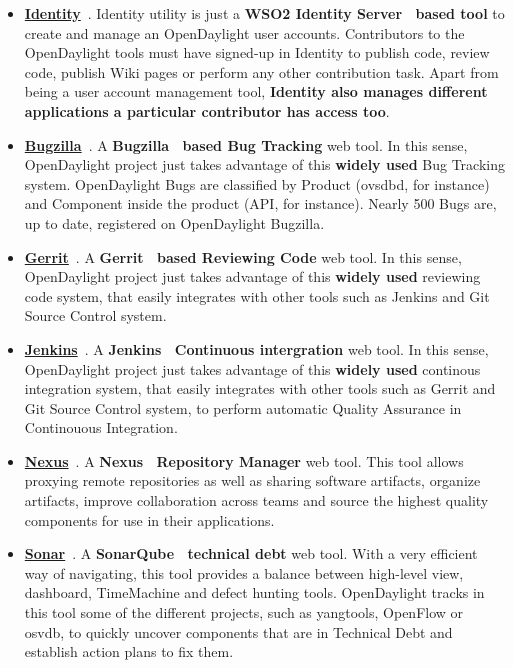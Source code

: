 \documentclass[a4paper, 12pt]{book}
\begin{document}
\begin{itemize}
\item{\textbf{\underline{Identity}}}~\cite{OpenDaylightIdentity}. Identity utility is just a \textbf{WSO2 Identity Server~\cite{WSO2IdentityServer} based tool} to create and manage an OpenDaylight user accounts. Contributors to the OpenDaylight tools must have signed-up in Identity to publish code, review code, publish Wiki pages or perform any other contribution task. Apart from being a user account management tool, \textbf{Identity also manages different applications a particular contributor has access too}.
\item{\textbf{\underline{Bugzilla}}}~\cite{OpenDaylightBugzilla}. A \textbf{Bugzilla~\cite{Bugzilla} based Bug Tracking} web tool. In this sense, OpenDaylight project just takes advantage of this \textbf{widely used} Bug Tracking system. OpenDaylight Bugs are classified by Product (ovsdbd, for instance) and Component inside the product (API, for instance). Nearly 500 Bugs are, up to date, registered on OpenDaylight Bugzilla.
\item{\textbf{\underline{Gerrit}}}~\cite{OpenDaylightGerrit}. A \textbf{Gerrit~\cite{Gerrit} based Reviewing Code} web tool. In this sense, OpenDaylight project just takes advantage of this \textbf{widely used} reviewing code system, that easily integrates with other tools such as Jenkins and Git Source Control system.
\item{\textbf{\underline{Jenkins}}}~\cite{OpenDaylightJenkins}. A \textbf{Jenkins~\cite{Jenkins} Continuous intergration} web tool. In this sense, OpenDaylight project just takes advantage of this \textbf{widely used} continous integration system, that easily integrates with other tools such as Gerrit and Git Source Control system, to perform automatic Quality Assurance in Continouous Integration.
\item{\textbf{\underline{Nexus}}}~\cite{OpenDaylightNexus}. A \textbf{Nexus~\cite{SonatypeNexus} Repository Manager} web tool. This tool allows proxying remote repositories as well as sharing software artifacts, organize artifacts, improve collaboration across teams and source the highest quality components for use in their applications.
\item{\textbf{\underline{Sonar}}}~\cite{OpenDaylightSonar}. A \textbf{SonarQube~\cite{SonarQube} technical debt} web tool. With a very efficient way of navigating, this tool provides a balance between high-level view, dashboard, TimeMachine and defect hunting tools. OpenDaylight tracks in this tool some of the different projects, such as yangtools, OpenFlow or osvdb, to quickly uncover components that are in Technical Debt and establish action plans to fix them.
\end{itemize}
\end{document}
